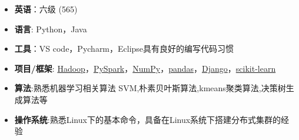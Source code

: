   \begin{itemize}[leftmargin=*]
    \item \textbf{英语}：六级 {\color{labelgrey}(565)}
    \item \textbf{语言}: Python，Java
    \item \textbf{工具}：VS code，Pycharm，Eclipse具有良好的编写代码习惯 
    \item \textbf{项目/框架}: \href{http://hadoop.apache.org/}{Hadoop}，\href{http://spark.apache.org/docs/latest/api/python/}{PySpark}，\href{http://www.numpy.org/}{NumPy}，\href{https://pandas.pydata.org/}{pandas}，\href{https://www.djangoproject.com/}{Django}，\href{http://scikit-learn.org//}{scikit-learn}
    \item \textbf{算法}:熟悉机器学习相关算法 SVM,朴素贝叶斯算法,kmeans聚类算法,决策树生成算法等
    \item \textbf{操作系统}:熟悉Linux下的基本命令，具备在Linux系统下搭建分布式集群的经验 \\
  \end{itemize}
